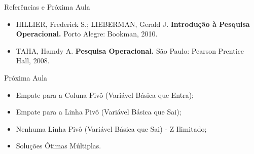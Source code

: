 \documentclass{if-beamer}
\begin{document}
\begin{frame}{Referências e Próxima Aula}

\begin{itemize}
    \item HILLIER, Frederick S.; LIEBERMAN, Gerald J. \textbf{Introdução à Pesquisa Operacional.} Porto Alegre: Bookman, 2010.
    \item TAHA, Hamdy A. \textbf{Pesquisa Operacional.} São Paulo: Pearson Prentice Hall, 2008.
\end{itemize}

\begin{block}{Próxima Aula}
    \begin{itemize}
        \item Empate para a Coluna Pivô (Variável Básica que Entra);
        \item Empate para a Linha Pivô (Variável Básica que Sai);
        \item Nenhuma Linha Pivô (Variável Básica que Sai) - Z Ilimitado;
        \item Soluções Ótimas Múltiplas.
    \end{itemize}
\end{block}

\end{frame}




{
\begin{frame}[plain]
\end{frame}
}
\end{document}
